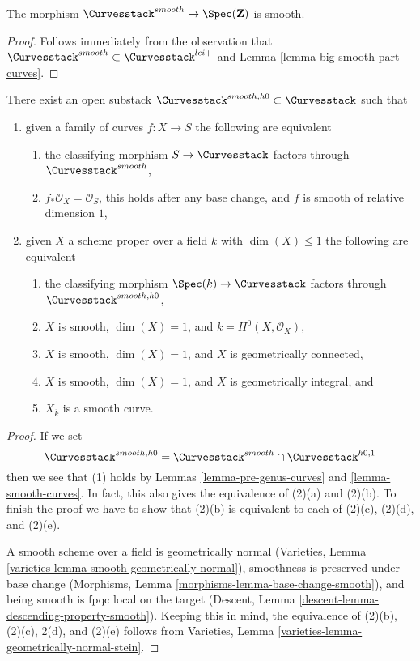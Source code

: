 \begin{lemma}
\label{lemma-smooth-curves-smooth}
The morphism $\Curvesstack^{smooth} \to \Spec(\mathbf{Z})$ is smooth.
\end{lemma}

\begin{proof}
Follows immediately from the observation that
$\Curvesstack^{smooth} \subset \Curvesstack^{lci+}$
and Lemma \ref{lemma-big-smooth-part-curves}.
\end{proof}

\begin{lemma}
\label{lemma-smooth-curves-h0}
There exist an open substack
$\Curvesstack^{smooth, h0} \subset \Curvesstack$
such that
\begin{enumerate}
\item given a family of curves $f : X \to S$ the following are equivalent
\begin{enumerate}
\item the classifying morphism $S \to \Curvesstack$ factors
through $\Curvesstack^{smooth}$,
\item $f_*\mathcal{O}_X = \mathcal{O}_S$, this holds after any base change,
and $f$ is smooth of relative dimension $1$,
\end{enumerate}
\item given $X$ a scheme proper over a field $k$ with
$\dim(X) \leq 1$ the following are equivalent
\begin{enumerate}
\item the classifying morphism $\Spec(k) \to \Curvesstack$
factors through $\Curvesstack^{smooth, h0}$,
\item $X$ is smooth, $\dim(X) = 1$, and $k = H^0(X, \mathcal{O}_X)$,
\item $X$ is smooth, $\dim(X) = 1$, and $X$ is geometrically connected,
\item $X$ is smooth, $\dim(X) = 1$, and $X$ is geometrically integral, and
\item $X_{\overline{k}}$ is a smooth curve.
\end{enumerate}
\end{enumerate}
\end{lemma}

\begin{proof}
If we set
$$
\Curvesstack^{smooth, h0} = \Curvesstack^{smooth} \cap
\Curvesstack^{h0, 1}
$$
then we see that (1) holds by
Lemmas \ref{lemma-pre-genus-curves} and \ref{lemma-smooth-curves}.
In fact, this also gives the equivalence of (2)(a) and (2)(b).
To finish the proof we have to show that
(2)(b) is equivalent to each of (2)(c), (2)(d), and (2)(e).

\medskip\noindent
A smooth scheme over a field is geometrically normal
(Varieties, Lemma \ref{varieties-lemma-smooth-geometrically-normal}),
smoothness is preserved under base change
(Morphisms, Lemma \ref{morphisms-lemma-base-change-smooth}), and
being smooth is fpqc local on the target
(Descent, Lemma \ref{descent-lemma-descending-property-smooth}).
Keeping this in mind, the equivalence of (2)(b), (2)(c), 2(d), and (2)(e)
follows from Varieties, Lemma \ref{varieties-lemma-geometrically-normal-stein}.
\end{proof}

